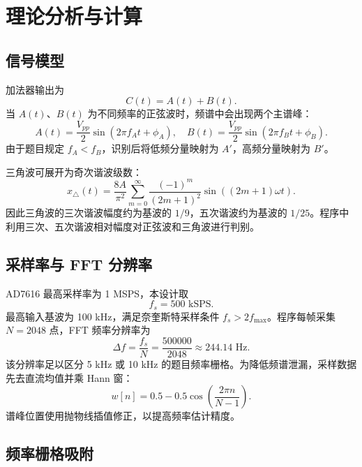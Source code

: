 \documentclass[UTF8,a4paper,zihao=-4]{ctexart}
\begin{document}
\section{理论分析与计算}

\subsection{信号模型}

加法器输出为
\begin{equation}
  C(t)=A(t)+B(t).
\end{equation}
当 $A(t)$、$B(t)$ 为不同频率的正弦波时，频谱中会出现两个主谱峰：
\begin{equation}
  A(t)=\frac{V_{pp}}{2}\sin(2\pi f_A t+\phi_A),\quad
  B(t)=\frac{V_{pp}}{2}\sin(2\pi f_B t+\phi_B).
\end{equation}
由于题目规定 $f_A<f_B$，识别后将低频分量映射为 $A'$，高频分量映射为 $B'$。

三角波可展开为奇次谐波级数：
\begin{equation}
  x_{\triangle}(t)=\frac{8A}{\pi^2}\sum_{m=0}^{\infty}\frac{(-1)^m}{(2m+1)^2}
  \sin\left((2m+1)\omega t\right).
\end{equation}
因此三角波的三次谐波幅度约为基波的 $1/9$，五次谐波约为基波的 $1/25$。程序中利用三次、五次谐波相对幅度对正弦波和三角波进行判别。

\subsection{采样率与 FFT 分辨率}

AD7616 最高采样率为 1 MSPS，本设计取
\begin{equation}
  f_s=500\text{ kSPS}.
\end{equation}
最高输入基波为 100 kHz，满足奈奎斯特采样条件 $f_s>2f_{\max}$。程序每帧采集 $N=2048$ 点，FFT 频率分辨率为
\begin{equation}
  \Delta f=\frac{f_s}{N}=\frac{500000}{2048}\approx244.14\text{ Hz}.
\end{equation}
该分辨率足以区分 5 kHz 或 10 kHz 的题目频率栅格。为降低频谱泄漏，采样数据先去直流均值并乘 Hann 窗：
\begin{equation}
  w[n]=0.5-0.5\cos\left(\frac{2\pi n}{N-1}\right).
\end{equation}
谱峰位置使用抛物线插值修正，以提高频率估计精度。

\subsection{频率栅格吸附}
\end{document}
